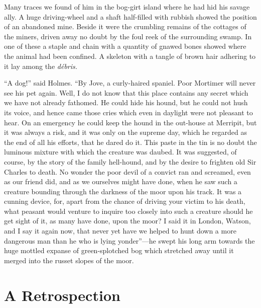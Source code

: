 \documentclass[paper=5.5in:8.5in,BCOR=7mm,twoside,DIV=calc,12pt,usegeometry,openany,chapterprefix,endperiod,headings=big]{scrbook} %
\begin{document}
Many traces we found of him in the bog-girt island where he had hid his savage ally. A huge driving-wheel and a shaft half-filled with rubbish showed the position of an abandoned mine. Beside it were the crumbling remains of the cottages of the miners, driven away no doubt by the foul reek of the surrounding swamp. In one of these a staple and chain with a quantity of gnawed bones showed where the animal had been confined. A skeleton with a tangle of brown hair adhering to it lay among the \textit{débris.}

\enquote{A dog!} said Holmes. \enquote{By Jove, a curly-haired spaniel. Poor Mortimer will never see his pet again. Well, I do not know that this place contains any secret which we have not already fathomed. He could hide his hound, but he could not hush its voice, and hence came those cries which even in daylight were not pleasant to hear. On an emergency he could keep the hound in the out-house at Merripit, but it was always a risk, and it was only on the supreme day, which he regarded as the end of all his efforts, that he dared do it. This paste in the tin is no doubt the luminous mixture with which the creature was daubed. It was suggested, of course, by the story of the family hell-hound, and by the desire to frighten old Sir Charles to death. No wonder the poor devil of a convict ran and screamed, even as our friend did, and as we ourselves might have done, when he saw such a creature bounding through the darkness of the moor upon his track. It was a cunning device, for, apart from the chance of driving your victim to his death, what peasant would venture to inquire too closely into such a creature should he get sight of it, as many have done, upon the moor? I said it in London, Watson, and I say it again now, that never yet have we helped to hunt down a more dangerous man than he who is lying yonder}---he swept his long arm towards the huge mottled expanse of green-splotched bog which stretched away until it merged into the russet slopes of the moor.

\chapter{A Retrospection}
\end{document}
